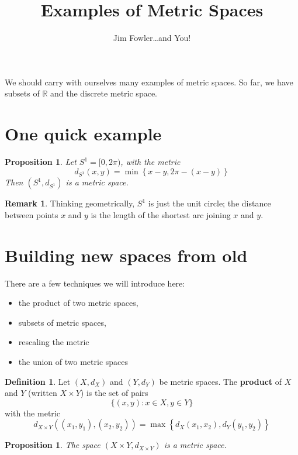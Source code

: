 \documentclass[12pt]{article}
\title{Examples of Metric Spaces}
\author{Jim Fowler\ldots and You!}
\date{}
\newcommand{\R}{\mathbb{R}}
\theoremstyle{plain}%
\newtheorem{proposition}[theorem]{Proposition}
\theoremstyle{definition}
\newtheorem{definition}{Definition}[theorem]
\newtheorem{remark}{Remark}[theorem]
\begin{document}
\maketitle

We should carry with ourselves many examples of metric spaces.  So
far, we have subsets of $\R$ and the discrete metric space.

\section{One quick example}

\begin{proposition}
Let $S^1 = [0,2\pi)$, with the metric
$$
d_{S^1}( x, y ) = \min \left\{ x - y, 2\pi - (x-y) \right\}
$$ 
Then $(S^1, d_{S^1})$ is a metric space.
\end{proposition}

\begin{remark}
Thinking geometrically, $S^1$ is just the
unit circle; the distance between points $x$ and $y$ is the length
of the shortest arc joining $x$ and $y$.
\end{remark}

\section{Building new spaces from old}

There are a few techniques we will introduce here:
\begin{itemize}
\item the product of two metric spaces,
\item subsets of metric spaces,
\item rescaling the metric
\item the union of two metric spaces
\end{itemize}

\begin{definition}
Let $(X, d_X)$ and $(Y, d_Y)$ be metric spaces.  The \textbf{product} of $X$ and $Y$ (written $X \times Y$) is
the set of pairs
$$
\{ (x,y) : x \in X, y \in Y \}
$$
with the metric
$$
d_{X \times Y}\left( (x_1,y_1), (x_2, y_2) \right) = \max \left\{ d_X(x_1,x_2), d_Y(y_1,y_2) \right\}
$$
\end{definition}

\begin{proposition}
The space $(X \times Y, d_{X \times Y})$ is a metric space.
\end{proposition}
\end{document}

